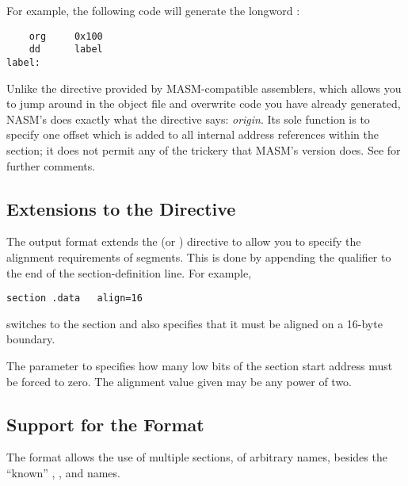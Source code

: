 For example, the following code will generate the longword
:

\begin{lstlisting}
    org     0x100
    dd      label
label:
\end{lstlisting}

Unlike the  directive provided by MASM-compatible assemblers,
which allows you to jump around in the object file and overwrite
code you have already generated, NASM's  does exactly what
the directive says: \emph{origin}. Its sole function is to specify one
offset which is added to all internal address references within the
section; it does not permit any of the trickery that MASM's version
does. See  for further comments.

\subsection{ Extensions to the 
Directive}
\label{subsec:binseg}

The  output format extends the  (or )
directive to allow you to specify the alignment requirements of segments.
This is done by appending the  qualifier to the end of
the section-definition line. For example,

\begin{lstlisting}
section .data   align=16
\end{lstlisting}

switches to the section  and also specifies that it must be
aligned on a 16-byte boundary.

The parameter to  specifies how many low bits of the
section start address must be forced to zero. The alignment value
given may be any power of two.

\subsection{ Support for the  Format}
\label{subsec:multisec}

The  format allows the use of multiple sections, of arbitrary names,
besides the ``known'' , , and  names.

